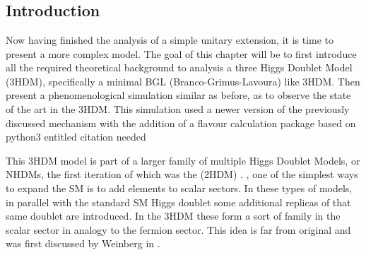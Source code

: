 
\newpage 

\chapter{}\label{section:3HDM}


%

\section{Introduction}

Now having finished the analysis of a simple unitary extension, it is time to present a more complex model. 
%
The goal of this chapter will be to first introduce all the required theoretical background to  analysis  a three Higgs Doublet Model (3HDM), specifically\Joaoadd{,} a minimal BGL (Branco-Grimus-Lavoura)  like 3HDM. 
% 
Then  present a phenomenological simulation similar as before, as to observe the state of the art in the 3HDM. 
%
This simulation used a newer version of the previously discussed mechanism with the addition of a flavour calculation package based on python3 entitled  { \color{blue} citation needed}  

This 3HDM model is part of a larger family of multiple Higgs Doublet Models, or NHDMs, the first iteration of which was the  (2HDM) . 
% 
, one of the simplest ways to expand the SM is to add elements to  scalar sectors. 
%
In these types of models, in parallel with the standard SM Higgs doublet\Joaoadd{,} some additional replicas of that same doublet are introduced. 
%
In the 3HDM these form a sort of family in the scalar sector in analogy to the fermion sector. 
%
This idea is far from original and was first discussed by Weinberg in \cite{Weinberg1976}.

